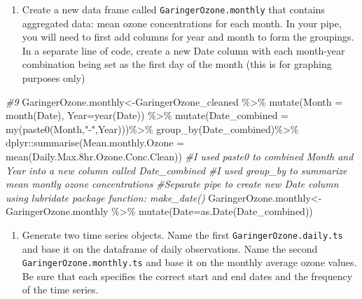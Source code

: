 \documentclass[
]{article}
\newenvironment{Shaded}{\begin{snugshade}}{\end{snugshade}}
\newcommand{\AttributeTok}[1]{\textcolor[rgb]{0.77,0.63,0.00}{#1}}
\newcommand{\CommentTok}[1]{\textcolor[rgb]{0.56,0.35,0.01}{\textit{#1}}}
\newcommand{\FloatTok}[1]{\textcolor[rgb]{0.00,0.00,0.81}{#1}}
\newcommand{\FunctionTok}[1]{\textcolor[rgb]{0.00,0.00,0.00}{#1}}
\newcommand{\NormalTok}[1]{#1}
\newcommand{\OtherTok}[1]{\textcolor[rgb]{0.56,0.35,0.01}{#1}}
\newcommand{\SpecialCharTok}[1]{\textcolor[rgb]{0.00,0.00,0.00}{#1}}
\newcommand{\StringTok}[1]{\textcolor[rgb]{0.31,0.60,0.02}{#1}}
\providecommand{\tightlist}{%
  \setlength{\itemsep}{0pt}\setlength{\parskip}{0pt}}
\begin{document}
\begin{enumerate}
\def\labelenumi{\arabic{enumi}.}
\setcounter{enumi}{8}
\tightlist
\item
  Create a new data frame called \texttt{GaringerOzone.monthly} that
  contains aggregated data: mean ozone concentrations for each month. In
  your pipe, you will need to first add columns for year and month to
  form the groupings. In a separate line of code, create a new Date
  column with each month-year combination being set as the first day of
  the month (this is for graphing purposes only)
\end{enumerate}

\begin{Shaded}
\begin{Highlighting}[]
\CommentTok{\#9}
\NormalTok{GaringerOzone.monthly}\OtherTok{\textless{}{-}}\NormalTok{GaringerOzone\_cleaned }\SpecialCharTok{\%\textgreater{}\%}
                       \FunctionTok{mutate}\NormalTok{(}\AttributeTok{Month =} \FunctionTok{month}\NormalTok{(Date),}
                              \AttributeTok{Year=}\FunctionTok{year}\NormalTok{(Date)) }\SpecialCharTok{\%\textgreater{}\%}
                       \FunctionTok{mutate}\NormalTok{(}\AttributeTok{Date\_combined =} \FunctionTok{my}\NormalTok{(}\FunctionTok{paste0}\NormalTok{(Month,}\StringTok{"{-}"}\NormalTok{,Year)))}\SpecialCharTok{\%\textgreater{}\%} 
                       \FunctionTok{group\_by}\NormalTok{(Date\_combined)}\SpecialCharTok{\%\textgreater{}\%}
\NormalTok{                       dplyr}\SpecialCharTok{::}\FunctionTok{summarise}\NormalTok{(}\AttributeTok{Mean.monthly.Ozone =} \FunctionTok{mean}\NormalTok{(Daily.Max}\FloatTok{.8}\NormalTok{hr.Ozone.Conc.Clean))}
\CommentTok{\#I used paste0 to combined Month and Year into a new column called Date\_combined}
\CommentTok{\#I used group\_by to summarize mean montly ozone concentrations}
\CommentTok{\#Separate pipe to create new Date column using lubridate package function: make\_date()}
\NormalTok{GaringerOzone.monthly}\OtherTok{\textless{}{-}}\NormalTok{GaringerOzone.monthly }\SpecialCharTok{\%\textgreater{}\%}
                       \FunctionTok{mutate}\NormalTok{(}\AttributeTok{Date=}\FunctionTok{as.Date}\NormalTok{(Date\_combined))}
\end{Highlighting}
\end{Shaded}

\begin{enumerate}
\def\labelenumi{\arabic{enumi}.}
\setcounter{enumi}{9}
\tightlist
\item
  Generate two time series objects. Name the first
  \texttt{GaringerOzone.daily.ts} and base it on the dataframe of daily
  observations. Name the second \texttt{GaringerOzone.monthly.ts} and
  base it on the monthly average ozone values. Be sure that each
  specifies the correct start and end dates and the frequency of the
  time series.
\end{enumerate}
\end{document}
